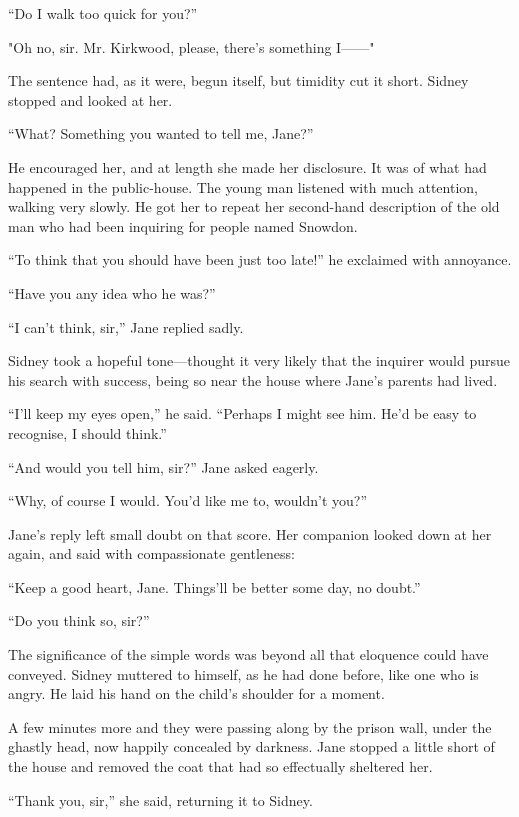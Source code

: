 ``Do I walk too quick for you?''

"Oh no, sir. Mr. Kirkwood, please, there's something I{{------}}"

The sentence had, as it were, begun itself, but timidity cut it short.
Sidney stopped and looked at her.

``What? Something you wanted to tell me, Jane?''

He encouraged her, and at length she made her disclosure. It was of what
had happened in the public-house. The young man listened with much
attention, walking very slowly. He got her to repeat her second-hand
description of the old man who had been inquiring for people named
Snowdon.

``To think that you should have been just too late!'' he exclaimed with
annoyance.

``Have you any idea who he was?''

``I can't think, sir,'' Jane replied sadly.

{\protect\hypertarget{33}{}{}}Sidney took a hopeful tone---thought it
very likely that the inquirer would pursue his search with success,
being so near the house where Jane's parents had lived.

``I'll keep my eyes open,'' he said. ``Perhaps I might see him. He'd be
easy to recognise, I should think.''

``And would you tell him, sir?'' Jane asked eagerly.

``Why, of course I would. You'd like me to, wouldn't you?''

Jane's reply left small doubt on that score. Her companion looked down
at her again, and said with compassionate gentleness:

``Keep a good heart, Jane. Things'll be better some day, no doubt.''

``Do you think so, sir?''

The significance of the simple words was beyond all that eloquence could
have conveyed. Sidney muttered to himself, as he had done before, like
one who is angry. He laid his hand on the child's shoulder for a moment.

A few minutes more and they were passing
{\protect\hypertarget{34}{}{}}along by the prison wall, under the
ghastly head, now happily concealed by darkness. Jane stopped a little
short of the house and removed the coat that had so effectually
sheltered her.

``Thank you, sir,'' she said, returning it to Sidney.

